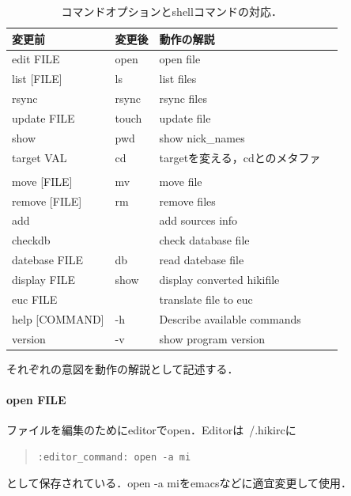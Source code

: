 \begin{table}[htbp]\begin{center}
\caption{コマンドオプションとshellコマンドの対応．}
\label{table:ShellOption}
\begin{tabular}{llll}
\hline
変更前  &変更後  &動作の解説  \\ \hline
edit FILE         &open  &open file  \\
list [FILE]       &ls  &list files  \\
rsync             &rsync  &rsync files  \\
update FILE       &touch  &update file  \\
show              &pwd  &show nick\_names  \\
target VAL        &cd  &targetを変える，cdとのメタファ  \\
  &  \\
move [FILE]       &mv  &move file  \\
remove [FILE]     &rm  &remove files  \\
add               &  &add sources info  \\
checkdb           &  &check database file  \\
datebase FILE     &db  &read datebase file  \\
display FILE      &show  &display converted hikifile  \\
euc FILE          &  &translate file to euc  \\
help [COMMAND]    &-h  &Describe available commands  \\
version           &-v  &show program version  \\
\hline
\end{tabular}
\label{default}
\end{center}\end{table}

それぞれの意図を動作の解説として記述する．

\paragraph{open FILE}
ファイルを編集のためにeditorでopen．Editorは~/.hikircに
\begin{quote}\begin{verbatim}
:editor_command: open -a mi
\end{verbatim}\end{quote}
として保存されている．open -a miをemacsなどに適宜変更して使用．


